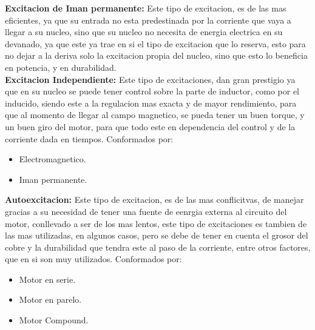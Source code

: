 \documentclass[12pt,a4paper]{article}
\begin{document}
\textbf{Excitacion de Iman permanente:} Este tipo de excitacion, es de las mas eficientes, ya que su entrada no esta predestinada por la corriente que vaya a llegar a su nucleo, sino que su nucleo no necesita de energia electrica en su devanado, ya que este ya trae en si el tipo de excitacion que lo reserva, esto para no dejar a la deriva solo la excitacion propia del nucleo, sino que esto lo beneficia en potencia, y en durabilidad.\\

\textbf{Excitacion Independiente:} Este tipo de excitaciones, dan gran prestigio ya que en su nucleo se puede tener control sobre la parte de inductor, como por el inducido, siendo este a la regulacion mas exacta y de mayor rendimiento, para que al momento de llegar al campo magnetico, se pueda tener un buen torque, y un buen giro del motor, para que todo este en dependencia del control y de la corriente dada en tiempos.
Conformados por:\\
\begin{itemize}
\item Electromagnetico.
\item Iman permanente.
\end{itemize}

\textbf{Autoexcitacion:} Este tipo de excitacion, es de las mas conflicitvas, de manejar gracias a su necesidad de tener una fuente de eenrgia externa al circuito del motor, conllevado a ser de los mas lentos, este tipo de excitaciones es tambien de las mas utilizadas, en algunos casos, pero se debe de tener en cuenta el grosor del cobre y la durabilidad que tendra este al paso de la corriente, entre otros factores, que en si son muy utilizados.
Conformados por:\\
\begin{itemize}
\item Motor en serie.
\item Motor en parelo.
\item Motor Compound.
\end{itemize}



\end{document}
